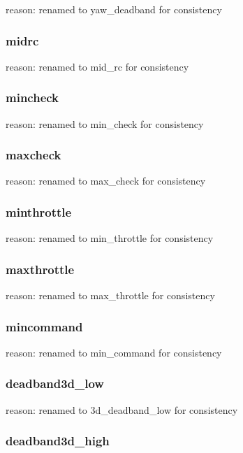 reason\+: renamed to {\ttfamily yaw\+\_\+deadband} for consistency

\subsubsection*{midrc}

reason\+: renamed to {\ttfamily mid\+\_\+rc} for consistency

\subsubsection*{mincheck}

reason\+: renamed to {\ttfamily min\+\_\+check} for consistency

\subsubsection*{maxcheck}

reason\+: renamed to {\ttfamily max\+\_\+check} for consistency

\subsubsection*{minthrottle}

reason\+: renamed to {\ttfamily min\+\_\+throttle} for consistency

\subsubsection*{maxthrottle}

reason\+: renamed to {\ttfamily max\+\_\+throttle} for consistency

\subsubsection*{mincommand}

reason\+: renamed to {\ttfamily min\+\_\+command} for consistency

\subsubsection*{deadband3d\+\_\+low}

reason\+: renamed to {\ttfamily 3d\+\_\+deadband\+\_\+low} for consistency

\subsubsection*{deadband3d\+\_\+high}

